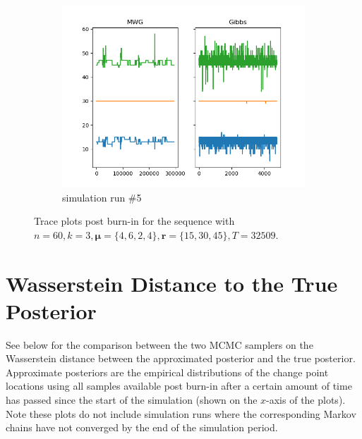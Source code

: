 \begin{figure}[H]
\begin{subfigure}{.3\textwidth}
    	\includegraphics[width=\linewidth]{../../plots/Trace_post_burnin_M4_N60_NMCMC3_seed4_diffind2.png}
    	\caption{simulation run \#5}
    	\label{fig:eg_after}
	\end{subfigure}
	\caption{Trace plots post burn-in for the sequence with $n=60, k=3, \bm{\mu} = \{4,6,2,4\}, \bm{r} = \{15,30,45\}, T=32509$.}
\end{figure}

\section{Wasserstein Distance to the True Posterior}\label{appendix:wass}

See below for the comparison between the two MCMC samplers on the Wasserstein distance between the approximated posterior and the true posterior. Approximate posteriors are the empirical distributions of the change point locations using all samples available post burn-in after a certain amount of time has passed since the start of the simulation (shown on the $x$-axis of the plots). Note these plots do not include simulation runs where the corresponding Markov chains have not converged by the end of the simulation period.

